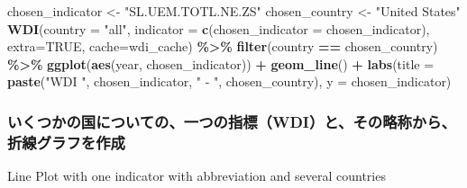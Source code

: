 \documentclass[
  xelatex, ja=standard]{bxjsbook}
\newenvironment{Shaded}{\begin{snugshade}}{\end{snugshade}}
\newcommand{\AttributeTok}[1]{\textcolor[rgb]{0.13,0.29,0.53}{#1}}
\newcommand{\ConstantTok}[1]{\textcolor[rgb]{0.56,0.35,0.01}{#1}}
\newcommand{\FunctionTok}[1]{\textcolor[rgb]{0.13,0.29,0.53}{\textbf{#1}}}
\newcommand{\NormalTok}[1]{#1}
\newcommand{\OtherTok}[1]{\textcolor[rgb]{0.56,0.35,0.01}{#1}}
\newcommand{\SpecialCharTok}[1]{\textcolor[rgb]{0.81,0.36,0.00}{\textbf{#1}}}
\newcommand{\StringTok}[1]{\textcolor[rgb]{0.31,0.60,0.02}{#1}}
\theoremstyle{definition}
\theoremstyle{definition}
\theoremstyle{definition}
\theoremstyle{definition}
\theoremstyle{remark}
\begin{document}
\begin{Shaded}
\begin{Highlighting}[]
\NormalTok{chosen\_indicator }\OtherTok{\textless{}{-}} \StringTok{"SL.UEM.TOTL.NE.ZS"}
\NormalTok{chosen\_country }\OtherTok{\textless{}{-}} \StringTok{"United States"}
\FunctionTok{WDI}\NormalTok{(}\AttributeTok{country =} \StringTok{"all"}\NormalTok{, }\AttributeTok{indicator =} \FunctionTok{c}\NormalTok{(}\AttributeTok{chosen\_indicator =}\NormalTok{ chosen\_indicator), }
    \AttributeTok{extra=}\ConstantTok{TRUE}\NormalTok{, }\AttributeTok{cache=}\NormalTok{wdi\_cache) }\SpecialCharTok{\%\textgreater{}\%}
  \FunctionTok{filter}\NormalTok{(country }\SpecialCharTok{==}\NormalTok{ chosen\_country) }\SpecialCharTok{\%\textgreater{}\%} 
  \FunctionTok{ggplot}\NormalTok{(}\FunctionTok{aes}\NormalTok{(year, chosen\_indicator)) }\SpecialCharTok{+} \FunctionTok{geom\_line}\NormalTok{() }\SpecialCharTok{+}
  \FunctionTok{labs}\NormalTok{(}\AttributeTok{title =} \FunctionTok{paste}\NormalTok{(}\StringTok{"WDI "}\NormalTok{, chosen\_indicator, }\StringTok{" {-} "}\NormalTok{, chosen\_country), }
       \AttributeTok{y =}\NormalTok{ chosen\_indicator)}
\end{Highlighting}
\end{Shaded}

\hypertarget{ux3044ux304fux3064ux304bux306eux56fdux306bux3064ux3044ux3066ux306eux4e00ux3064ux306eux6307ux6a19wdiux3068ux305dux306eux7565ux79f0ux304bux3089ux6298ux7ddaux30b0ux30e9ux30d5ux3092ux4f5cux6210}{%
\subsubsection{いくつかの国についての、一つの指標（WDI）と、その略称から、折線グラフを作成}\label{ux3044ux304fux3064ux304bux306eux56fdux306bux3064ux3044ux3066ux306eux4e00ux3064ux306eux6307ux6a19wdiux3068ux305dux306eux7565ux79f0ux304bux3089ux6298ux7ddaux30b0ux30e9ux30d5ux3092ux4f5cux6210}}

Line Plot with one indicator with abbreviation and several countries
\end{document}
